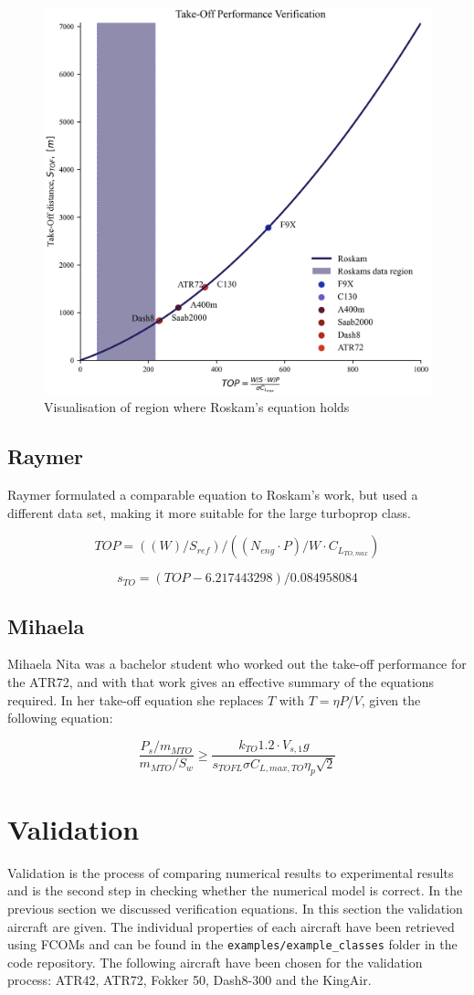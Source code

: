 \begin{figure}[!ht]
    \centering
    \includegraphics[width=0.5\linewidth]{figures/roskam_inaccurate.png}
    \caption{Visualisation of region where Roskam's equation holds}
    \label{fig:roskam_inaccuracy}
\end{figure}

\subsection{Raymer}
Raymer formulated a comparable equation to Roskam's work, but used a different data set, making it more suitable for the large turboprop class.

\begin{equation}\label{eq:raymer_TOP}
    TOP = ((W)/S_{ref})/((N_{eng} \cdot P)/W \cdot C_{L_{TO,max}})
\end{equation}

\begin{equation}\label{eq:raymer}
    s_{TO} = (TOP-6.217443298)/0.084958084
\end{equation}

\subsection{Mihaela}
Mihaela Nita was a bachelor student who worked out the take-off performance for the ATR72, and with that work gives an effective summary of the equations required. In her take-off equation she replaces $T$ with $T=\eta P /V$, given the following equation:

\begin{equation}\label{eq:mihaela}
    \frac{P_s/m_{MTO}}{m_{MTO}/S_w} \geq \frac{k_{TO}1.2\cdot V_{s,1}g}{s_{TOFL}\sigma C_{L,max,TO}\eta_p\sqrt{2}}
\end{equation}

\section{Validation}\label{sec:validation}
Validation is the process of comparing numerical results to experimental results and is the second step in checking whether the numerical model is correct. In the previous section we discussed verification equations. In this section the validation aircraft are given. The individual properties of each aircraft have been retrieved using FCOMs and can be found in the \texttt{examples/example\_classes} folder in the code repository. The following aircraft have been chosen for the validation process: ATR42, ATR72, Fokker 50, Dash8-300 and the KingAir.

